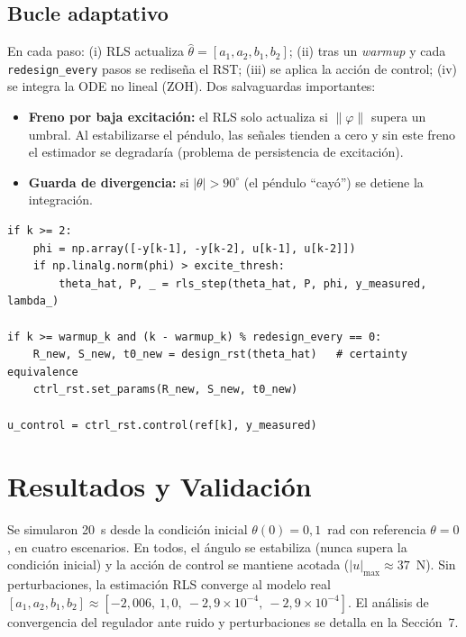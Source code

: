 \documentclass[a4paper,11pt]{report}
\begin{document}
\subsection{Bucle adaptativo}

En cada paso: (i) RLS actualiza $\hat\theta = [a_1,a_2,b_1,b_2]$; (ii) tras un
\emph{warmup} y cada \texttt{redesign\_every} pasos se rediseña el RST; (iii) se
aplica la acción de control; (iv) se integra la ODE no lineal (ZOH). Dos
salvaguardas importantes:
\begin{itemize}[nosep]
  \item \textbf{Freno por baja excitación:} el RLS solo actualiza si
  $\lVert\varphi\rVert$ supera un umbral. Al estabilizarse el péndulo, las
  señales tienden a cero y sin este freno el estimador se degradaría (problema
  de persistencia de excitación).
  \item \textbf{Guarda de divergencia:} si $|\theta| > 90^\circ$ (el péndulo
  ``cayó'') se detiene la integración.
\end{itemize}

\begin{lstlisting}[caption={Nucleo del bucle de simulacion.}]
if k >= 2:
    phi = np.array([-y[k-1], -y[k-2], u[k-1], u[k-2]])
    if np.linalg.norm(phi) > excite_thresh:
        theta_hat, P, _ = rls_step(theta_hat, P, phi, y_measured, lambda_)

if k >= warmup_k and (k - warmup_k) % redesign_every == 0:
    R_new, S_new, t0_new = design_rst(theta_hat)   # certainty equivalence
    ctrl_rst.set_params(R_new, S_new, t0_new)

u_control = ctrl_rst.control(ref[k], y_measured)
\end{lstlisting}

\section{Resultados y Validación}

Se simularon 20~s desde la condición inicial $\theta(0) = 0{,}1$~rad con
referencia $\theta = 0$, en cuatro escenarios. En todos, el ángulo se estabiliza
(nunca supera la condición inicial) y la acción de control se mantiene acotada
($|u|_{\max} \approx 37$~N). Sin perturbaciones, la estimación RLS converge al
modelo real
$[a_1,a_2,b_1,b_2] \approx [-2{,}006,\ 1{,}0,\ -2{,}9\!\times\!10^{-4},\ -2{,}9\!\times\!10^{-4}]$.
El análisis de convergencia del regulador ante ruido y perturbaciones se detalla
en la Sección~7.
\end{document}
